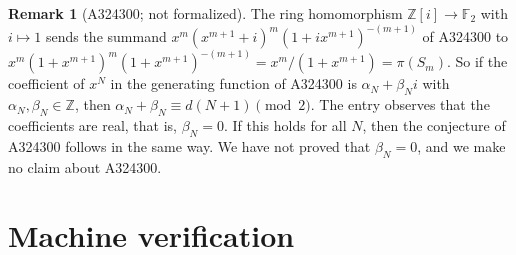 \documentclass[11pt]{amsart}
\theoremstyle{plain}
\theoremstyle{definition}
\newtheorem{remark}[theorem]{Remark}
\newcommand{\Z}{\mathbb{Z}}
\newcommand{\F}{\mathbb{F}_2}
\begin{document}
\begin{remark}[A324300; not formalized]\label{rem:A324300}
The ring homomorphism $\Z[i]\to\F$ with $i\mapsto1$ sends the summand $x^m(x^{m+1}+i)^m(1+ix^{m+1})^{-(m+1)}$ of A324300 to $x^m(1+x^{m+1})^m(1+x^{m+1})^{-(m+1)}=x^m/(1+x^{m+1})=\pi(S_m)$. So if the coefficient of $x^N$ in the generating function of A324300 is $\alpha_N+\beta_Ni$ with $\alpha_N,\beta_N\in\Z$, then $\alpha_N+\beta_N\equiv d(N+1)\pmod 2$. The entry observes that the coefficients are real, that is, $\beta_N=0$. If this holds for all $N$, then the conjecture of A324300 \cite{A324300} follows in the same way. We have not proved that $\beta_N=0$, and we make no claim about A324300.
\end{remark}

\section{Machine verification}\label{sec:lean}
\end{document}
